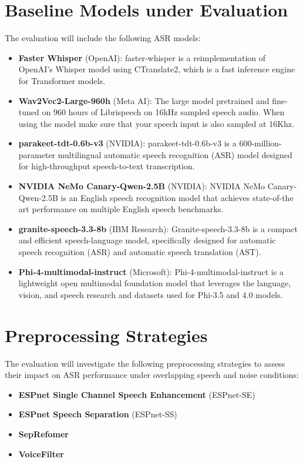 \section{Baseline Models under Evaluation}
The evaluation will include the following ASR models:
\begin{itemize}
    \item \textbf{Faster Whisper} (OpenAI): faster-whisper is a reimplementation of OpenAI's Whisper model using CTranslate2, which is a fast inference engine for Transformer models. \cite{github_openai_faster-whisper}
    \item \textbf{Wav2Vec2-Large-960h} (Meta AI): The large model pretrained and fine-tuned on 960 hours of Librispeech on 16kHz sampled speech audio. When using the model make sure that your speech input is also sampled at 16Khz. \cite{facebook_wav2vec2-large-960h}
    \item \textbf{parakeet-tdt-0.6b-v3} (NVIDIA): parakeet-tdt-0.6b-v3 is a 600-million-parameter multilingual automatic speech recognition (ASR) model designed for high-throughput speech-to-text transcription. \cite{nvidia/parakeet-tdt-0.6b-v3}
    \item \textbf{NVIDIA NeMo Canary-Qwen-2.5B} (NVIDIA): NVIDIA NeMo Canary-Qwen-2.5B is an English speech recognition model that achieves state-of-the art performance on multiple English speech benchmarks. \cite{nvidia/canary-qwen-2.5b}
    \item \textbf{granite-speech-3.3-8b} (IBM Research): Granite-speech-3.3-8b is a compact and efficient speech-language model, specifically designed for automatic speech recognition (ASR) and automatic speech translation (AST). \cite{ibm-granite/granite-speech-3.3-8b}
    \item \textbf{Phi-4-multimodal-instruct} (Microsoft): Phi-4-multimodal-instruct is a lightweight open multimodal foundation model that leverages the language, vision, and speech research and datasets used for Phi-3.5 and 4.0 models. \cite{microsoft/phi-4-multimodal-instruct}
\end{itemize}
\section{Preprocessing Strategies}
The evaluation will investigate the following preprocessing strategies to assess their impact on ASR performance under overlapping speech and noise conditions:
\begin{itemize}
    \item \textbf{ESPnet Single Channel Speech Enhancement} (ESPnet-SE) \cite{ESPnet}
    \item \textbf{ESPnet Speech Separation} (ESPnet-SS) \cite{ESPnet}
    \item \textbf{SepRefomer} \cite{SepReformer}
    \item \textbf{VoiceFilter} \cite{VoiceFilter}
\end{itemize}

